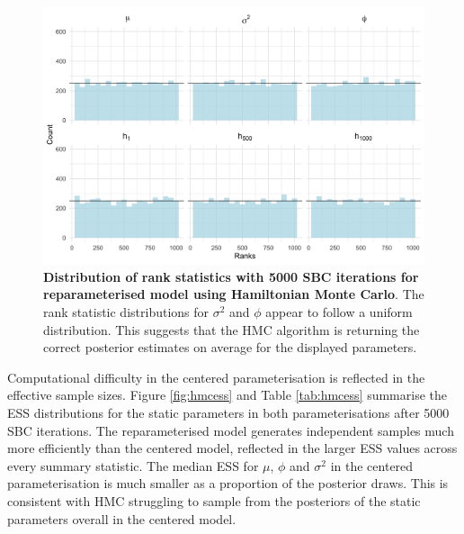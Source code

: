 \documentclass[12pt, a4paper]{article}
\begin{document}
    \begin{figure}[H]
        \centering
        \includegraphics[scale=0.09]{results/hmc_ncp_5k.png}
        \caption{\textbf{Distribution of rank statistics with 5000 SBC iterations for reparameterised model using Hamiltonian Monte Carlo}. The rank statistic distributions for $\sigma^2$ and $\phi$ appear to follow a uniform distribution. This suggests that the HMC algorithm is returning the correct posterior estimates on average for the displayed parameters.}
        \label{fig:ncphmc5k}
    \end{figure}

    Computational difficulty in the centered parameterisation is reflected in the effective sample sizes. Figure \ref{fig:hmcess} and Table \ref{tab:hmcess} summarise the ESS distributions for the static parameters in both parameterisations after 5000 SBC iterations. The reparameterised model generates independent samples much more efficiently than the centered model, reflected in the larger ESS values across every summary statistic. The median ESS for $\mu$, $\phi$ and $\sigma^2$ in the centered parameterisation is much smaller as a proportion of the posterior draws. This is consistent with HMC struggling to sample from the posteriors of the static parameters overall in the centered model. 
\end{document}
